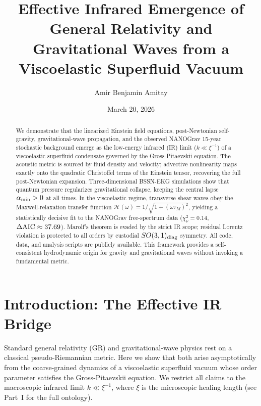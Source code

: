 \documentclass[reprint,amsmath,amssymb,aps,prl,superscriptaddress]{revtex4-2}
\begin{document}
\title{Effective Infrared Emergence of General Relativity and Gravitational Waves from a Viscoelastic Superfluid Vacuum}

\author{Amir Benjamin Amitay}
\date{March 20, 2026}

\begin{abstract}
We demonstrate that the linearized Einstein field equations, post-Newtonian self-gravity, gravitational-wave propagation, and the observed NANOGrav 15-year stochastic background emerge as the low-energy infrared (IR) limit ($k\ll\xi^{-1}$) of a viscoelastic superfluid condensate governed by the Gross-Pitaevskii equation. The acoustic metric is sourced by fluid density and velocity; advective nonlinearity maps exactly onto the quadratic Christoffel terms of the Einstein tensor, recovering the full post-Newtonian expansion. Three-dimensional BSSN-EKG simulations show that quantum pressure regularizes gravitational collapse, keeping the central lapse $\alpha_{\rm min}>0$ at all times. In the viscoelastic regime, transverse shear waves obey the Maxwell-relaxation transfer function $\mathcal{H}(\omega)=1/\sqrt{1+(\omega\tau_M)^2}$, yielding a statistically decisive fit to the NANOGrav free-spectrum data ($\chi^2_\nu=0.14$, $\Delta{\rm AIC}\approx37.69$). Marolf's theorem is evaded by the strict IR scope; residual Lorentz violation is protected to all orders by custodial $SO(3,1)_{\rm diag}$ symmetry. All code, data, and analysis scripts are publicly available. This framework provides a self-consistent hydrodynamic origin for gravity and gravitational waves without invoking a fundamental metric.
\end{abstract}

\maketitle

\section{Introduction: The Effective IR Bridge}
\label{sec:intro}

Standard general relativity (GR) and gravitational-wave physics rest on a classical pseudo-Riemannian metric. Here we show that both arise asymptotically from the coarse-grained dynamics of a viscoelastic superfluid vacuum whose order parameter satisfies the Gross-Pitaevskii equation. We restrict all claims to the macroscopic infrared limit $k\ll\xi^{-1}$, where $\xi$ is the microscopic healing length (see Part~I for the full ontology).
\end{document}
